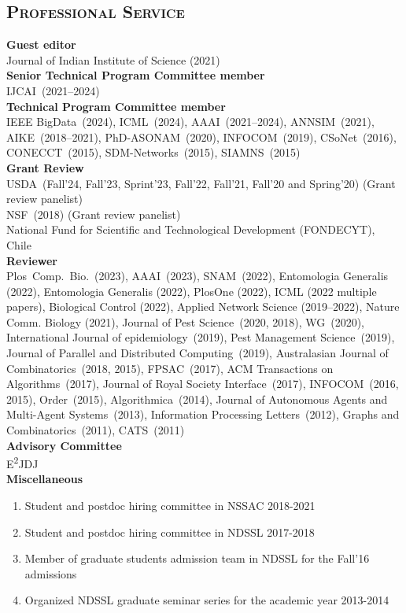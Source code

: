 \documentclass[margin,10pt]{res} %
\begin{document}
\begin{resume}
{\section{\textnormal{\textsc{Professional Service}}}
\noindent\textbf{Guest editor}\\
Journal of Indian Institute of Science (2021)
\smallskip\\
\noindent\textbf{Senior Technical Program Committee member}\\ 
IJCAI~(2021--2024)
\smallskip\\
\noindent\textbf{Technical Program Committee member}\\ 
IEEE BigData~(2024), ICML~(2024), AAAI~(2021--2024), ANNSIM~(2021), AIKE~(2018--2021), PhD-ASONAM~(2020), INFOCOM~(2019), CSoNet~(2016), CONECCT~(2015), SDM-Networks~(2015), SIAMNS~(2015)\smallskip\\
\noindent\textbf{Grant Review}\\
USDA~(Fall'24, Fall'23, Sprint'23, Fall'22, Fall'21, Fall'20 and Spring'20) (Grant review panelist)\\
NSF~(2018) (Grant review panelist)\\
National Fund for Scientific and Technological Development (FONDECYT),
Chile\smallskip\\
\noindent\textbf{Reviewer}\\ 
\noindent
Plos~Comp.~Bio.~(2023),
AAAI~(2023),
SNAM~(2022),
Entomologia Generalis (2022),
Entomologia Generalis (2022),
PlosOne (2022),
ICML (2022 multiple papers),
Biological Control (2022),
Applied Network Science (2019--2022),
Nature Comm. Biology (2021),
Journal of Pest Science~(2020, 2018), 
WG~(2020),
International Journal of epidemiology~(2019),
Pest Management Science~(2019), 
Journal of Parallel and Distributed Computing~(2019), 
Australasian Journal of Combinatorics~(2018, 2015),
FPSAC~(2017),
ACM Transactions on Algorithms~(2017),
Journal of Royal Society Interface~(2017), INFOCOM~(2016, 2015), Order~(2015), 
Algorithmica~(2014), Journal of Autonomous Agents and Multi-Agent
Systems~(2013), 
Information Processing Letters~(2012), 
Graphs and
Combinatorics~(2011), CATS~(2011)\smallskip\\
\noindent\textbf{Advisory Committee}\\
E\textsuperscript{2}JDJ\bigskip\\
\noindent\textbf{Miscellaneous}\\ 
\begin{enumerate}[$\circ$]
\item Student and postdoc hiring committee in NSSAC 2018-2021
\item Student and postdoc hiring committee in NDSSL 2017-2018
\item Member of graduate students admission team in NDSSL for the Fall'16
admissions
\item Organized NDSSL graduate seminar series for the academic year 2013-2014
\end{enumerate}
}
\end{resume}

\end{document}
